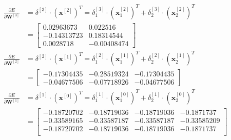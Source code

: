 \documentclass[12pt]{article}
\begin{document}
\begin{enumerate}[leftmargin=\labelsep]
    \begin{equation}
    \begin{aligned}
        \frac{\partial E}{\partial \mathbf{W}^{[3]}} &= \delta^{[3]} \cdot (\mathbf{x}^{[2]})^T = \delta_1^{[3]} \cdot (\mathbf{x}_1^{[2]})^T + \delta_2^{[3]} \cdot (\mathbf{x}_2^{[2]})^T \\
        &= \begin{bmatrix}
            0.02963673 & 0.022516 \\
            -0.14313723 & 0.18314544 \\
             0.0028718 & -0.00408474
        \end{bmatrix} \\
        \frac{\partial E}{\partial \mathbf{W}^{[2]}} &= \delta^{[2]} \cdot (\mathbf{x}^{[1]})^T = \delta_1^{[2]} \cdot (\mathbf{x}_1^{[1]})^T + \delta_2^{[2]} \cdot (\mathbf{x}_2^{[1]})^T \\
        &= \begin{bmatrix}
            -0.17304435 & -0.28519324 & -0.17304435 \\
            -0.04677506 & -0.07718926 & -0.04677506
        \end{bmatrix} \\
        \frac{\partial E}{\partial \mathbf{W}^{[1]}} &= \delta^{[1]} \cdot (\mathbf{x}^{[0]})^T = \delta_1^{[1]} \cdot (\mathbf{x}_1^{[0]})^T + \delta_2^{[1]} \cdot (\mathbf{x}_2^{[0]})^T \\
        &= \begin{bmatrix}
            -0.18720702 & -0.18719036 & -0.18719036 & -0.1871737 \\
            -0.33589165 & -0.33587187 & -0.33587187 & -0.33585209 \\
            -0.18720702 & -0.18719036 & -0.18719036 & -0.1871737 \\
        \end{bmatrix}
    \end{aligned}
    \end{equation}


\end{enumerate}
\end{document}
